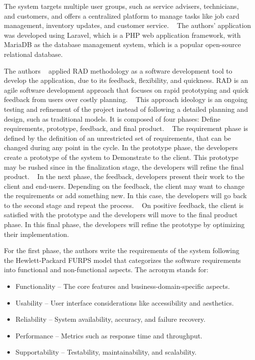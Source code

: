 The system targets multiple user groups, such as service advisers, technicians, and customers, and offers a centralized platform to manage tasks like job card management, inventory updates, and customer service. ~\cite{MAS_MOTORS}
The authors' application was developed using Laravel, which is a PHP web application framework, with MariaDB as the database management system, which is a popular open-source relational database.

The authors ~\citet{MAS_MOTORS} applied \ac{RAD} methodology as a software development tool to develop the application, due to its feedback, flexibility, and quickness.
\ac{RAD} is an agile software development approach that focuses on rapid prototyping and quick feedback from users over costly planning. ~\cite{rapid_app_development}
This approach ideology is an ongoing testing and refinement of the project instead of following a detailed planning and design, such as traditional models.
It is composed of four phases: Define requirements, prototype, feedback, and final product. ~\cite{rapid_app_development}
The requirement phase is defined by the definition of an unrestricted set of requirements, that can be changed during any point in the cycle. 
In the prototype phase, the developers create a prototype of the system to Demonstrate to the client. 
This prototype may be rushed since in the finalization stage, the developers will refine the final product. ~\cite{rapid_app_development}
In the next phase, the feedback, developers present their work to the client and end-users.
Depending on the feedback, the client may want to change the requirements or add something new. In this case, the developers will go back to the second stage and repeat the process. ~\cite{rapid_app_development}
On positive feedback, the client is satisfied with the prototype and the developers will move to the final product phase.
In this final phase, the developers will refine the prototype by optimizing their implementation. ~\cite{rapid_app_development}

For the first phase, the authors write the requirements of the system following the Hewlett-Packard \ac{FURPS} model that categorizes the software requirements into functional and non-functional aspects.
The acronym stands for:

\begin{itemize}
   \item Functionality – The core features and business-domain-specific aspects.
   \item Usability – User interface considerations like accessibility and aesthetics.
   \item Reliability – System availability, accuracy, and failure recovery.
   \item Performance – Metrics such as response time and throughput.
   \item Supportability – Testability, maintainability, and scalability.
  \end{itemize}

